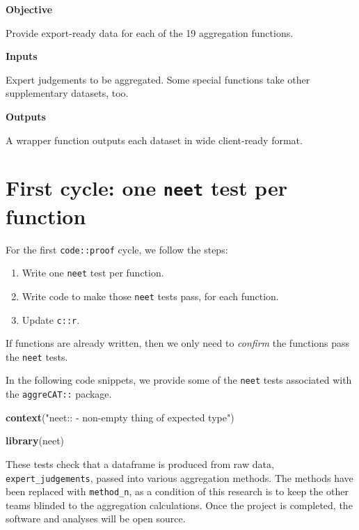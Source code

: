 \documentclass[
]{article}
\newenvironment{Shaded}{\begin{snugshade}}{\end{snugshade}}
\newcommand{\KeywordTok}[1]{\textcolor[rgb]{0.13,0.29,0.53}{\textbf{#1}}}
\newcommand{\NormalTok}[1]{#1}
\newcommand{\StringTok}[1]{\textcolor[rgb]{0.31,0.60,0.02}{#1}}
\providecommand{\tightlist}{%
  \setlength{\itemsep}{0pt}\setlength{\parskip}{0pt}}
\begin{document}
\textbf{Objective}

Provide export-ready data for each of the 19 aggregation functions.

\textbf{Inputs}

Expert judgements to be aggregated. Some special functions take other supplementary datasets, too.

\textbf{Outputs}

A wrapper function outputs each dataset in wide client-ready format.

\hypertarget{first-cycle-one-neet-test-per-function}{%
\section{\texorpdfstring{First cycle: one \texttt{neet} test per function}{First cycle: one neet test per function}}\label{first-cycle-one-neet-test-per-function}}

For the first \texttt{code::proof} cycle, we follow the steps:

\begin{enumerate}
\def\labelenumi{\arabic{enumi}.}
\tightlist
\item
  Write one \texttt{neet} test per function.
\item
  Write code to make those \texttt{neet} tests pass, for each function.
\item
  Update \texttt{c::r}.
\end{enumerate}

If functions are already written, then we only need to \emph{confirm} the functions pass the \texttt{neet} tests.

In the following code snippets, we provide some of the \texttt{neet} tests associated with the \texttt{aggreCAT::} package.

\begin{Shaded}
\begin{Highlighting}[]
\KeywordTok{context}\NormalTok{(}\StringTok{"neet:: {-} non{-}empty thing of expected type"}\NormalTok{)}

\KeywordTok{library}\NormalTok{(neet)}
\end{Highlighting}
\end{Shaded}

These tests check that a dataframe is produced from raw data, \texttt{expert\_judgements}, passed into various aggregation methods. The methods have been replaced with \texttt{method\_n}, as a condition of this research is to keep the other teams blinded to the aggregation calculations. Once the project is completed, the software and analyses will be open source.
\end{document}
